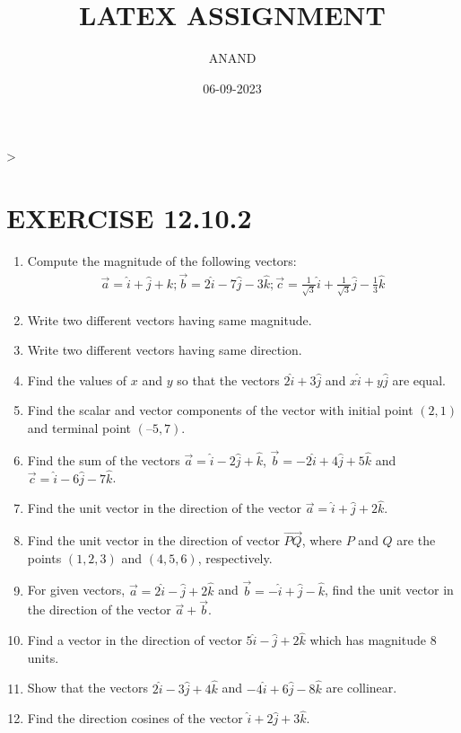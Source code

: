 \documentclass{article}
\theoremstyle{remark}
\begin{document}
\title{LATEX ASSIGNMENT}
\author{ANAND}
\date{06-09-2023}
\maketitle                                                                       >
\section*{EXERCISE 12.10.2}
\begin{enumerate}
\item Compute the magnitude of the following vectors:
\begin{align*}
\overrightarrow{a}=\hat{i}+\hat{j}+k; \overrightarrow{b}=2\hat{i}-7\hat{j}-3\hat{k}; \overrightarrow{c}=\frac{1}{\sqrt{3}}\hat{i}+\frac{1}{\sqrt{3}}\hat{j}-\frac{1}{3}\hat{k}
\end{align*}
\item Write two different vectors having same magnitude.
\item Write two different vectors having same direction.
\item Find the values of $x$ and $y$ so that the vectors $2\hat{i}+3\hat{j}$ and $x\hat{i}+y\hat{j}$ are equal.
\item Find the scalar and vector components of the vector with initial point $(2, 1)$ and terminal point $(– 5, 7)$.
\item Find the sum of the vectors $\overrightarrow{a}=\hat{i}-2\hat{j}+\hat{k}$, $\overrightarrow{b}=-2\hat{i}+4\hat{j}+5\hat{k}$ and $\overrightarrow{c}=\hat{i}-6\hat{j}-7\hat{k}$.
\item Find the unit vector in the direction of the vector $\overrightarrow{a}=\hat{i}+\hat{j}+2\hat{k}$.
\item Find the unit vector in the direction of vector $\overrightarrow{PQ}$, where $P$ and $Q$ are the points $(1, 2, 3)$ and $(4, 5, 6)$, respectively.
\item For given vectors, $\overrightarrow{a}=2\hat{i}-\hat{j}+2\hat{k}$ and $\overrightarrow{b}=-\hat{i}+\hat{j}-\hat{k}$, find the unit vector in the direction of the vector $\overrightarrow{a}+\overrightarrow{b}$.
\item Find a vector in the direction of vector $5\hat{i}-\hat{j}+2\hat{k}$ which has magnitude 8 units.
\item Show that the vectors $2\hat{i}-3\hat{j}+4\hat{k}$ and $-4\hat{i}+6\hat{j}-8\hat{k}$ are collinear.
\item Find the direction cosines of the vector $\hat{i}+2\hat{j}+3\hat{k}$.

\end{enumerate}
\end{document}
